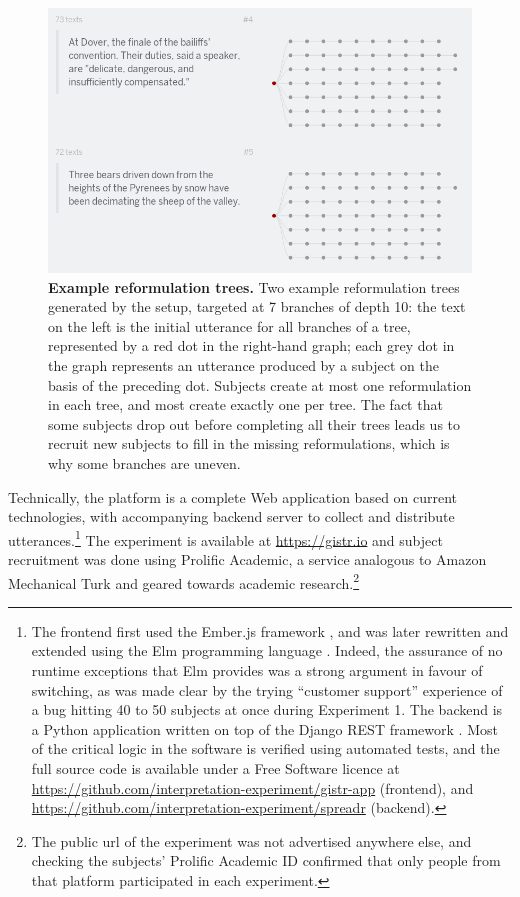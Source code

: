\begin{figure}[!ht]
  \centering
  \includegraphics[width=.75\linewidth]{images/manual/gistr-trees.png}
  \caption[Example reformulation trees]{
  \textbf{Example reformulation trees.}
  Two example reformulation trees generated by the setup, targeted at 7 branches of depth 10:
  the text on the left is the initial utterance for all branches of a tree, represented by a red dot in the right-hand graph; each grey dot in the graph represents an utterance produced by a subject on the basis of the preceding dot.
  Subjects create at most one reformulation in each tree, and most create exactly one per tree.
  The fact that some subjects drop out before completing all their trees leads us to recruit new subjects to fill in the missing reformulations, which is why some branches are uneven.
  }
  \label{fig:gistr-trees}
\end{figure}

Technically, the platform is a complete Web application based on current
technologies, with accompanying backend server to collect and distribute
utterances.\footnote{The frontend first used the Ember.js framework
  \autocite{ember.js_contributors_ember.js:_2017}, and was later
  rewritten and extended using the Elm programming language
  \autocite{czaplicki_elm:_2017}. Indeed, the assurance of no runtime
  exceptions that Elm provides was a strong argument in favour of
  switching, as was made clear by the trying \enquote{customer support}
  experience of a bug hitting 40 to 50 subjects at once during
  Experiment 1. The backend is a Python application written on top of
  the Django REST framework \autocite{christie_django_2017}. Most of the
  critical logic in the software is verified using automated tests, and
  the full source code is available under a Free Software licence at
  \url{https://github.com/interpretation-experiment/gistr-app}
  (frontend), and
  \url{https://github.com/interpretation-experiment/spreadr} (backend).}
The experiment is available at \url{https://gistr.io} and subject
recruitment was done using Prolific Academic, a service analogous to
Amazon Mechanical Turk and geared towards academic research.\footnote{The
  public url of the experiment was not advertised anywhere else, and
  checking the subjects' Prolific Academic ID confirmed that only people
  from that platform participated in each experiment.}

